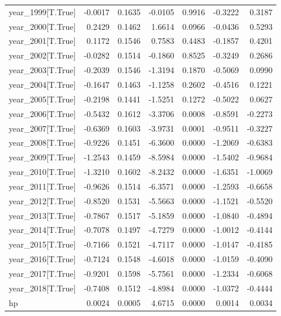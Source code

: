 \begin{table}
\begin{center}
\begin{tabular}{lrrrrrr}
year\_1999[T.True] & -0.0017 &   0.1635 &  -0.0105 &      0.9916 & -0.3222 &  0.3187  \\
year\_2000[T.True] &  0.2429 &   0.1462 &   1.6614 &      0.0966 & -0.0436 &  0.5293  \\
year\_2001[T.True] &  0.1172 &   0.1546 &   0.7583 &      0.4483 & -0.1857 &  0.4201  \\
year\_2002[T.True] & -0.0282 &   0.1514 &  -0.1860 &      0.8525 & -0.3249 &  0.2686  \\
year\_2003[T.True] & -0.2039 &   0.1546 &  -1.3194 &      0.1870 & -0.5069 &  0.0990  \\
year\_2004[T.True] & -0.1647 &   0.1463 &  -1.1258 &      0.2602 & -0.4516 &  0.1221  \\
year\_2005[T.True] & -0.2198 &   0.1441 &  -1.5251 &      0.1272 & -0.5022 &  0.0627  \\
year\_2006[T.True] & -0.5432 &   0.1612 &  -3.3706 &      0.0008 & -0.8591 & -0.2273  \\
year\_2007[T.True] & -0.6369 &   0.1603 &  -3.9731 &      0.0001 & -0.9511 & -0.3227  \\
year\_2008[T.True] & -0.9226 &   0.1451 &  -6.3600 &      0.0000 & -1.2069 & -0.6383  \\
year\_2009[T.True] & -1.2543 &   0.1459 &  -8.5984 &      0.0000 & -1.5402 & -0.9684  \\
year\_2010[T.True] & -1.3210 &   0.1602 &  -8.2432 &      0.0000 & -1.6351 & -1.0069  \\
year\_2011[T.True] & -0.9626 &   0.1514 &  -6.3571 &      0.0000 & -1.2593 & -0.6658  \\
year\_2012[T.True] & -0.8520 &   0.1531 &  -5.5663 &      0.0000 & -1.1521 & -0.5520  \\
year\_2013[T.True] & -0.7867 &   0.1517 &  -5.1859 &      0.0000 & -1.0840 & -0.4894  \\
year\_2014[T.True] & -0.7078 &   0.1497 &  -4.7279 &      0.0000 & -1.0012 & -0.4144  \\
year\_2015[T.True] & -0.7166 &   0.1521 &  -4.7117 &      0.0000 & -1.0147 & -0.4185  \\
year\_2016[T.True] & -0.7124 &   0.1548 &  -4.6018 &      0.0000 & -1.0159 & -0.4090  \\
year\_2017[T.True] & -0.9201 &   0.1598 &  -5.7561 &      0.0000 & -1.2334 & -0.6068  \\
year\_2018[T.True] & -0.7408 &   0.1512 &  -4.8984 &      0.0000 & -1.0372 & -0.4444  \\
hp                 &  0.0024 &   0.0005 &   4.6715 &      0.0000 &  0.0014 &  0.0034  \\

\end{tabular}
\end{center}
\end{table}
